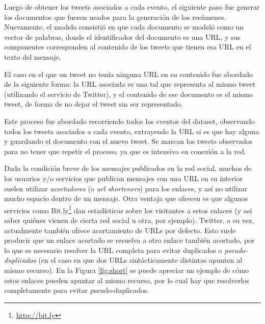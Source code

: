     Luego de obtener los tweets asociados a cada evento, el siguiente
    paso fue generar los documentos que fueron usados para la
    generación de los resúmenes. Nuevamente, el modelo consistió en que cada
    documento se modeló como un vector de palabras, donde el
    identificador del documento es una URL, y sus componentes
    corresponden al contenido de los tweets que tienen esa URL en el
    texto del mensaje.

    El caso en el que un tweet no tenía ninguna URL en su contenido
    fue abordado de la siguiente forma: la URL asociada es una tal que
    representa al mismo tweet (utilizando el servicio de Twitter), y
    el contenido de ese documento es el mismo tweet, de forma de no
    dejar el tweet sin ser representado.

    Este proceso fue abordado recorriendo todos los eventos del
    dataset, observando todos los tweets asociados a cada evento,
    extrayendo la URL si es que hay alguna y guardando el documento
    con el nuevo tweet. Se marcan los tweets observados para no tener
    que repetir el proceso, ya que es intensivo en conexión a la red.

    Dada la condición breve de los mensajes publicados en la red
    social, muchos de los usuarios y/o servicios que publican mensajes
    con una URL en su interior suelen utilizar \emph{acortadores}
    (o \emph{url shorteners}) para los enlaces, y así no utilizar mucho
    espacio dentro de un
    mensaje. Otra ventaja que ofrecen es que algunos servicios como
    Bit.ly\footnote{\href{http://bit.ly}{http://bit.ly} } dan estadísticas sobre los visitantes a
    estos enlaces (y así saber quiénes vienen de cierta red social u
    otra, por ejemplo). Twitter, a su vez, actualmente también ofrece
    acortamiento de URLs por defecto. Esto suele producir que un enlace
    acortado se resuelva a otro enlace también acortado, por lo que es
    necesario resolver la URL completa para evitar duplicados o
    \emph{pseudo-duplicados} (en el caso en que dos URLs sintácticamente
    distintas apunten al mismo recurso). En la Figura \ref{fig:short}
    se puede apreciar un ejemplo de cómo estos enlaces pueden apuntar
    al mismo recurso, por lo cual hay que resolverlos completamente
    para evitar pseudo-duplicados.

